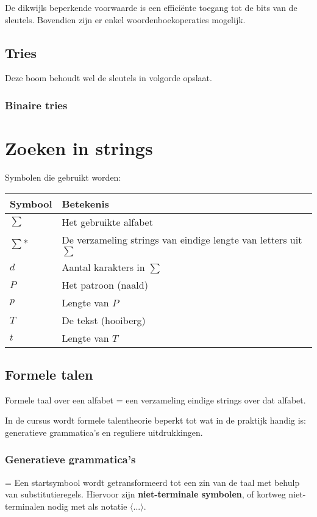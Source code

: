 \documentclass{report}
\begin{document}
De dikwijls beperkende voorwaarde is een efficiënte toegang tot de bits van de sleutels. Bovendien zijn er enkel woordenboekoperaties mogelijk.

\section{Tries}
Deze boom behoudt wel de sleutels in volgorde opslaat.
\subsection{Binaire tries}



\chapter{Zoeken in strings}
Symbolen die gebruikt worden:
\begin{table}[h]
	\centering
	\begin{tabular}{l l}
		\hline
		Symbool & Betekenis \\
		\hline 
		$\sum$ & Het gebruikte alfabet \\
		$\sum *$ & De verzameling strings van eindige lengte van letters uit $\sum$ \\
		$d$ & Aantal karakters in $\sum$ \\
		$P$ & Het patroon (naald) \\
		$p$ & Lengte van $P$ \\
		$T$ & De tekst (hooiberg) \\
		$t$ & Lengte van $T$ \\
		\hline 
	\end{tabular}
\end{table}
\section{Formele talen}
Formele taal over een alfabet = een verzameling eindige strings over dat alfabet. 

In de cursus wordt formele talentheorie beperkt tot wat in de praktijk handig is: generatieve grammatica's en reguliere uitdrukkingen.
\subsection{Generatieve grammatica's}
= Een startsymbool wordt getransformeerd tot een zin van de taal met behulp van substitutieregels. Hiervoor zijn \textbf{niet-terminale symbolen}, of kortweg niet-terminalen nodig met als notatie $\langle ... \rangle$.
\end{document}
